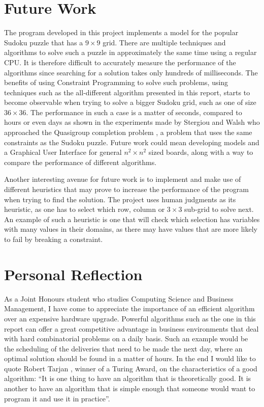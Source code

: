 \documentclass{l4proj}
\begin{document}
\section{Future Work}
\noindent The program developed in this project implements a model for the popular Sudoku puzzle that has a $9 \times 9$ grid. There are multiple techniques and algorithms to solve such a puzzle in approximately the same time using a regular CPU. It is therefore difficult to accurately measure the performance of the algorithms since searching for a solution takes only hundreds of milliseconds. The benefits of using Constraint Programming to solve such problems, using techniques such as the all-different algorithm presented in this report, starts to become observable when trying to solve a bigger Sudoku grid, such as one of size $36 \times 36$. The performance in such a case is a matter of seconds, compared to hours or even days as shown in the experiments made by Stergiou and Walsh \cite{stergiou1999difference} who approached the Quasigroup completion problem \cite{gomes2002completing}, a problem that uses the same constraints as the Sudoku puzzle. Future work could mean developing models and a Graphical User Interface for general $n^2\times n^2$ sized boards, along with a way to compare the performance of different algorithms.

\noindent Another interesting avenue for future work is to implement and make use of different heuristics that may prove to increase the performance of the program when trying to find the solution. The project uses human judgments as its heuristic, as one has to select which row, column or $3 \times 3$ sub-grid to solve next. An example of such a heuristic is one that will check which selection has variables with many values in their domains, as there may have values that are more likely to fail by breaking a constraint.

\section{Personal Reflection}
As a Joint Honours student who studies Computing Science and Business Management, I have come to appreciate the importance of an efficient algorithm over an expensive hardware upgrade. Powerful algorithms such as the one in this report can offer a great competitive advantage in business environments that deal with hard combinatorial problems on a daily basis. Such an example would be the scheduling of the deliveries that need to be made the next day, where an optimal solution should be found in a matter of hours. In the end I would like to quote Robert Tarjan \cite{tarjanart}, winner of a Turing Award, on the characteristics of a good algorithm: ``It is one thing to have an algorithm that is theoretically good. It is another to have an algorithm that is simple enough that someone would want to program it and use it in practice''.
\end{document}
